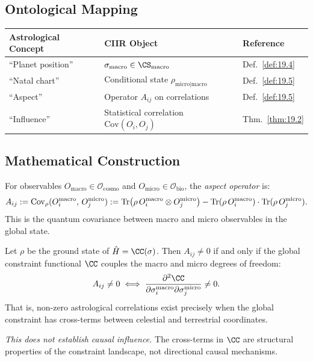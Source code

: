 \subsection{Ontological Mapping}

\begin{center}
\begin{tabular}{lll}
\toprule
\textbf{Astrological Concept} & \textbf{CIIR Object} & \textbf{Reference} \\
\midrule
``Planet position'' & $\sigma_{\mathrm{macro}} \in \CS_{\mathrm{macro}}$ & Def.~\ref{def:19.4} \\
``Natal chart'' & Conditional state $\rho_{\mathrm{micro} | \mathrm{macro}}$ & Def.~\ref{def:19.5} \\
``Aspect'' & Operator $A_{ij}$ on correlations & Def.~\ref{def:19.5} \\
``Influence'' & Statistical correlation $\mathrm{Cov}(O_i, O_j)$ & Thm.~\ref{thm:19.2} \\
\bottomrule
\end{tabular}
\end{center}

\subsection{Mathematical Construction}

\begin{definition}\label{def:19.5}
For observables $O_{\mathrm{macro}} \in \mathcal{O}_{\mathrm{cosmo}}$
and $O_{\mathrm{micro}} \in \mathcal{O}_{\mathrm{bio}}$, the
\emph{aspect operator} is:
\[
  A_{ij} := \mathrm{Cov}_\rho(O_i^{\mathrm{macro}},\, O_j^{\mathrm{micro}})
  := \mathrm{Tr}\bigl( \rho\, O_i^{\mathrm{macro}} \otimes O_j^{\mathrm{micro}} \bigr)
  - \mathrm{Tr}(\rho\, O_i^{\mathrm{macro}}) \cdot \mathrm{Tr}(\rho\, O_j^{\mathrm{micro}}).
\]
This is the quantum covariance between macro and micro observables
in the global state.
\end{definition}

\begin{theorem}\label{thm:19.2}
Let $\rho$ be the ground state of $\hatH = \CC(\sigma)$.  Then
$A_{ij} \neq 0$ if and only if the global constraint functional $\CC$
couples the macro and micro degrees of freedom:
\[
  A_{ij} \neq 0 \iff
  \frac{\partial^2 \CC}{\partial \sigma_i^{\mathrm{macro}}
  \partial \sigma_j^{\mathrm{micro}}} \neq 0.
\]
That is, non-zero astrological correlations exist precisely when the
global constraint has cross-terms between celestial and terrestrial
coordinates.

\emph{This does not establish causal influence.}  The cross-terms
in $\CC$ are structural properties of the constraint landscape, not
directional causal mechanisms.
\end{theorem}

